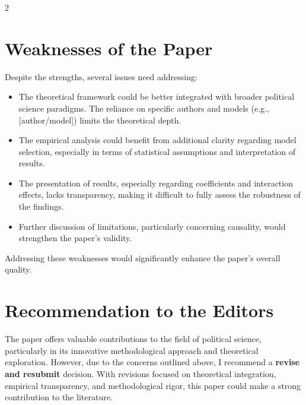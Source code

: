 \documentclass[11pt,a4paper]{article}
\begin{document}
\begin{multicols}{2}
\section{Weaknesses of the Paper}
Despite the strengths, several issues need addressing:
\begin{itemize}
    \item The theoretical framework could be better integrated with broader political science paradigms. The reliance on specific authors and models (e.g., [author/model]) limits the theoretical depth.
    \item The empirical analysis could benefit from additional clarity regarding model selection, especially in terms of statistical assumptions and interpretation of results.
    \item The presentation of results, especially regarding coefficients and interaction effects, lacks transparency, making it difficult to fully assess the robustness of the findings.
    \item Further discussion of limitations, particularly concerning causality, would strengthen the paper's validity.
\end{itemize}
Addressing these weaknesses would significantly enhance the paper's overall quality.


\section{Recommendation to the Editors}
The paper offers valuable contributions to the field of political science, particularly in its innovative methodological approach and theoretical exploration. However, due to the concerns outlined above, I recommend a \textbf{revise and resubmit} decision. With revisions focused on theoretical integration, empirical transparency, and methodological rigor, this paper could make a strong contribution to the literature.

\end{multicols}

\newpage



\end{document}
